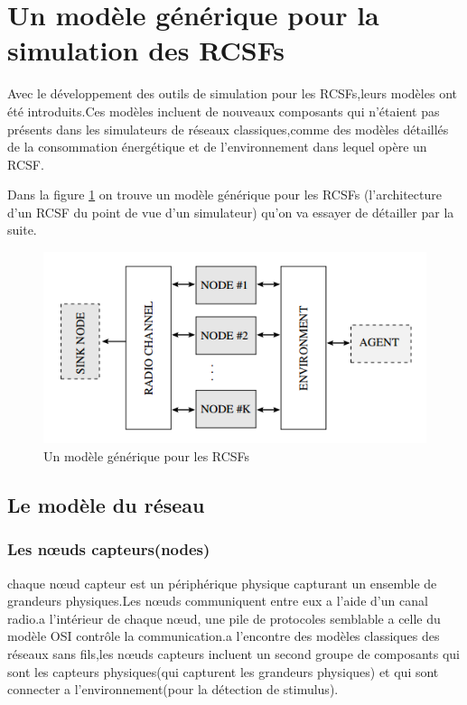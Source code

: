 \section{Un modèle générique  pour la simulation des RCSFs}
Avec le développement des outils de simulation pour les RCSFs,leurs modèles ont été introduits.Ces modèles incluent de nouveaux composants qui n'étaient pas présents dans les simulateurs de réseaux classiques,comme des modèles détaillés de la consommation énergétique et de l'environnement dans lequel opère un RCSF.

Dans la figure \ref{netModel} on trouve un modèle générique pour les RCSFs (l'architecture d'un RCSF du point de vue d'un simulateur) qu'on va essayer de détailler par la suite.

\begin{figure}[!h]
\caption{\label{netModel}Un modèle générique pour les RCSFs}
\includegraphics[scale=0.7]{netModel}
\end{figure}

\subsection{Le modèle du réseau}
\subsubsection{Les nœuds capteurs(nodes)}
chaque nœud capteur est un périphérique physique capturant un ensemble de grandeurs physiques.Les nœuds communiquent entre eux a l'aide d'un canal radio.a l'intérieur de chaque nœud, une pile de protocoles semblable a celle du modèle OSI contrôle la communication.a l'encontre des modèles classiques des réseaux sans fils,les nœuds capteurs incluent un second groupe de composants qui sont les capteurs physiques(qui capturent les grandeurs physiques) et qui sont connecter a l'environnement(pour la détection de stimulus).

